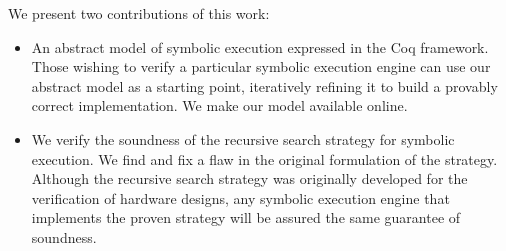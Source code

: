 We present two contributions of this work:
\begin{itemize}
  \item An abstract model of symbolic execution expressed in the Coq
    framework. Those wishing to verify a particular symbolic execution engine
    can use our abstract model as a starting point, iteratively refining it to
    build a provably correct implementation. We make our model available online.
\item We verify the soundness of the recursive search strategy for symbolic
  execution. We find and fix a flaw in the original formulation of the
  strategy. Although the recursive search strategy was originally developed for
  the verification of hardware designs, any symbolic execution engine that
  implements the proven strategy will be assured the same guarantee of soundness.
\end{itemize}
